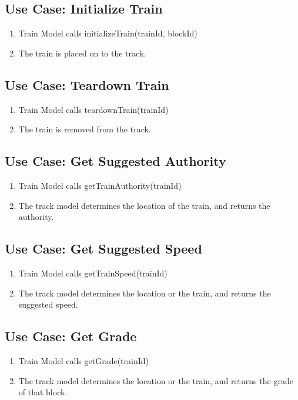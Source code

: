 \documentclass{scrreprt}
\begin{document}
\subsection{Use Case: Initialize Train}
\begin{enumerate}
	\item Train Model calls initializeTrain(trainId, blockId)
	\item The train is placed on to the track.
\end{enumerate}

\subsection{Use Case: Teardown Train}
\begin{enumerate}
	\item Train Model calls teardownTrain(trainId)
	\item The train is removed from the track.
\end{enumerate}

\subsection{Use Case: Get Suggested Authority}
\begin{enumerate}
	\item Train Model calls getTrainAuthority(trainId)
	\item The track model determines the location of the train, and returns the authority.
\end{enumerate}

\subsection{Use Case: Get Suggested Speed}
\begin{enumerate}
	\item Train Model calls getTrainSpeed(trainId)
	\item The track model determines the location or the train, and returns the suggested speed.
\end{enumerate}

\subsection{Use Case: Get Grade}
\begin{enumerate}
	\item Train Model calls getGrade(trainId)
	\item The track model determines the location or the train, and returns the grade of that block.
\end{enumerate}
\end{document}
